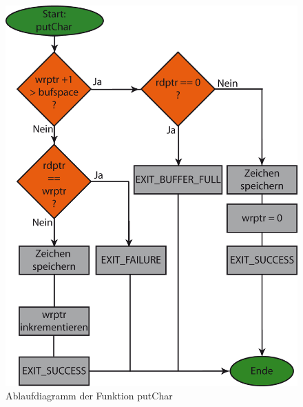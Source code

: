 \begin{figure}[h]
\includegraphics[scale = 0.8]{./putchar.png}
\hspace{-14pt}
\caption{Ablaufdiagramm der Funktion putChar}
\end{figure} 

